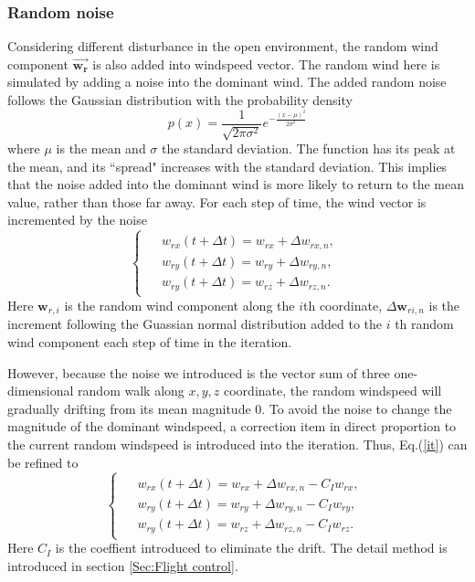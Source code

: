 \subsubsection{Random noise}
Considering different disturbance in the open environment, the random wind component $ \overrightarrow{\bm{w_{r}}} $ is also added into windspeed vector. The random wind here is simulated by adding a noise into the dominant wind. The added random noise follows the Gaussian distribution with the probability density \begin{equation}
    p(x)=\frac{1}{\sqrt{2 \pi \sigma^{2}}} e^{-\frac{(x-\mu)^{2}}{2 \sigma^{2}}}
\end{equation}
where $\mu$ is the mean and $\sigma$ the standard deviation. 
The function has its peak at the mean, and its ``spread" increases with the standard deviation. This implies that the noise added into the dominant wind is more likely to return to the mean value, rather than those far away. For each step of time, the wind vector is incremented by the noise \begin{equation}\label{it}
    \left\{\begin{array}{c}
        \begin{aligned}
            &w_{rx}(t+\Delta t)=w_{rx}+\Delta w_{rx,n},\\
            &w_{ry}(t+\Delta t)=w_{ry}+\Delta w_{ry,n},\\
            &w_{ry}(t+\Delta t)=w_{rz}+\Delta w_{rz,n}.
        \end{aligned}
    \end{array}
    \right.
\end{equation}
Here $ \boldsymbol{w}_{r, i}$ is the random wind component along the $ i $th coordinate, $ \Delta \boldsymbol{w}_{ri,n} $ is the increment following the Guassian normal distribution added to the $ i $ th random wind component each step of time in the iteration.

However, because the noise we introduced is the vector sum of three one-dimensional random walk along $ x,y,z $ coordinate, the random windspeed will gradually drifting from its mean magnitude $0$. To avoid the noise to change the magnitude of the dominant windspeed, a correction item in direct proportion to the current random windspeed is introduced into the iteration. Thus, Eq.(\ref{it}) can be refined to \begin{equation}
\left\{\begin{array}{c}
        \begin{aligned}
            &w_{rx}(t+\Delta t)=w_{rx}+\Delta w_{rx,n}-C_{I}w_{rx},\\
            &w_{ry}(t+\Delta t)=w_{ry}+\Delta w_{ry,n}-C_{I}w_{ry},\\
            &w_{ry}(t+\Delta t)=w_{rz}+\Delta w_{rz,n}-C_{I}w_{rz}.
        \end{aligned}
    \end{array}
    \right.
\end{equation}
Here $C_{I}$ is the coeffient introduced to eliminate the drift. The detail method is introduced in section \ref{Sec:Flight control}.


